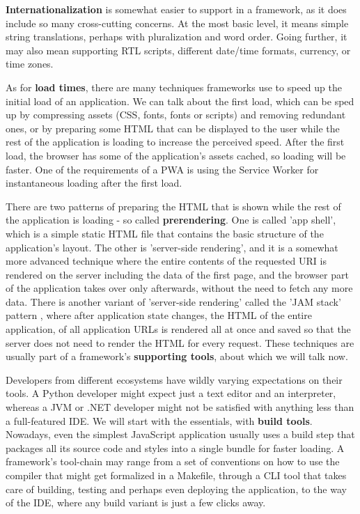 \documentclass[english,odsaz]{fitthesis}
\begin{document}
\textbf{Internationalization} is somewhat easier to support in a framework, as it does
include so many cross-cutting concerns. At the most basic level, it means simple
string translations, perhaps with pluralization and word order. Going further,
it may also mean supporting RTL scripts, different date/time formats, currency,
or time zones.

As for \textbf{load times}, there are many techniques frameworks use to speed up the
initial load of an application. We can talk about the first load, which can be
sped up by compressing assets (CSS, fonts, fonts or scripts) and removing
redundant ones, or by preparing some HTML that can be displayed to the user
while the rest of the application is loading to increase the perceived
speed. After the first load, the browser has some of the application's assets
cached, so loading will be faster. One of the requirements of a PWA is using the
Service Worker for instantaneous loading after the first load.

There are two patterns of preparing the HTML that is shown while the rest of the
application is loading - so called \textbf{prerendering}. One is called 'app shell',
which is a simple static HTML file that contains the basic structure of the
application's layout. The other is 'server-side rendering', and it is a somewhat
more advanced technique where the entire contents of the requested URI is
rendered on the server including the data of the first page, and the browser
part of the application takes over only afterwards, without the need to fetch
any more data. There is another variant of 'server-side rendering' called the
'JAM stack' pattern \cite{jamstack}, where after application state changes, the
HTML of the entire application, of all application URLs is rendered all at once
and saved so that the server does not need to render the HTML for every
request. These techniques are usually part of a framework's \textbf{supporting tools},
about which we will talk now.

Developers from different ecosystems have wildly varying expectations on their
tools. A Python developer might expect just a text editor and an interpreter,
whereas a JVM or .NET developer might not be satisfied with anything less than a
full-featured IDE. We will start with the essentials, with \textbf{build
tools}. Nowadays, even the simplest JavaScript application usually uses a build
step that packages all its source code and styles into a single bundle for
faster loading. A framework's tool-chain may range from a set of conventions on
how to use the compiler that might get formalized in a Makefile, through a CLI
tool that takes care of building, testing and perhaps even deploying the
application, to the way of the IDE, where any build variant is just a few clicks
away.
\end{document}
